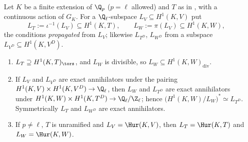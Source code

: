 \begin{proposition}\label{prop:galcoh:propagation}
Let $K$ be a finite extension of $\Q_p$ ($p=\ell$ allowed) and $T$ as in , with a continuous action of $G_K$. For a $\Q_\ell$-subspace
$L_V\subseteq H^1(K,V)$ put
\[
L_T:=\iota^{-1}(L_V)\subseteq H^1(K,T),\qquad L_W:=\pi(L_V)\subseteq H^1(K,W),
\]
the conditions \emph{propagated} from $L_V$; likewise $L_{T^D}$, $L_{W^D}$ from a subspace $L_{V^D}\subseteq H^1(K,V^D)$.
\begin{enumerate}[label=(\roman*)]
\item $L_T\supseteq H^1(K,T)_{\tors}$, and $L_W$ is divisible, so $L_W\subseteq H^1(K,W)_{\mathrm{div}}$.
\item If $L_V$ and $L_{V^D}$ are exact annihilators under the pairing $H^1(K,V)\times H^1(K,V^D)\to\Q_\ell$, then $L_W$ and $L_{T^D}$ are exact annihilators under
$H^1(K,W)\times H^1(K,T^D)\to\Q_\ell/\Z_\ell$; hence $\bigl(H^1(K,W)/L_W\bigr)^*\simeq L_{T^D}$. Symmetrically $L_T$ and $L_{W^D}$ are exact annihilators.
\item If $p\ne\ell$, $T$ is unramified and $L_V=\Hur(K,V)$, then $L_T=\Hur(K,T)$ and $L_W=\Hur(K,W)$.
\end{enumerate}
\end{proposition}

